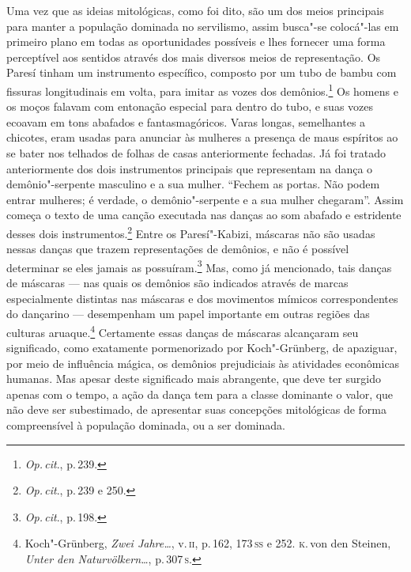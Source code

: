 Uma vez que as ideias mitológicas, como foi dito, são um dos meios
principais para manter a população dominada no servilismo, assim
busca"-se colocá"-las em primeiro plano em todas as oportunidades
possíveis e lhes fornecer uma forma perceptível aos sentidos através dos
mais diversos meios de representação. Os Paresí tinham um instrumento
específico, composto por um tubo de bambu com fissuras longitudinais em
volta, para imitar as vozes dos demônios.\footnote{\textit{Op.\,cit}., p.\,239.} Os
homens e os moços falavam com entonação especial para dentro do tubo, e
suas vozes ecoavam em tons abafados e fantasmagóricos. Varas longas,
semelhantes a chicotes, eram usadas para anunciar às mulheres a presença
de maus espíritos ao se bater nos telhados de folhas de casas
anteriormente fechadas. Já foi tratado anteriormente dos dois instrumentos
principais que representam na dança o demônio"-serpente masculino e a sua
mulher. ``Fechem as portas. Não podem entrar mulheres; é verdade, o
demônio"-serpente e a sua mulher chegaram''. Assim começa o texto de uma
canção executada nas danças ao som abafado e estridente desses
dois instrumentos.\footnote{\textit{Op.\,cit}., p.\,239 e 250.} Entre os
Paresí"-Kabizi, máscaras não são usadas nessas danças que trazem
representações de demônios, e não é possível determinar se eles jamais
as possuíram.\footnote{\textit{Op.\,cit}., p.\,198.} Mas, como já mencionado, tais
danças de máscaras --- nas quais os demônios são indicados através de
marcas especialmente distintas nas máscaras e dos movimentos mímicos
correspondentes do dançarino --- desempenham um papel importante em
outras regiões das culturas aruaque.\footnote{Koch"-Grünberg, \textit{Zwei
  Jahre\ldots}, v.\,\textsc{ii}, p.\,162, 173\,\textsc{ss} e 252. \textsc{k}.\,von den
  Steinen, \textit{Unter den Naturvölkern\ldots}, p.\,307\,\textsc{s}.}
Certamente essas danças de máscaras alcançaram seu significado, como
exatamente pormenorizado por Koch"-Grünberg, de apaziguar, por meio de
influência mágica, os demônios prejudiciais às atividades econômicas
humanas. Mas apesar deste significado mais abrangente, que deve ter
surgido apenas com o tempo, a ação da dança tem para a classe dominante
o valor, que não deve ser subestimado, de apresentar suas concepções
mitológicas de forma compreensível à população dominada, ou a ser dominada.

